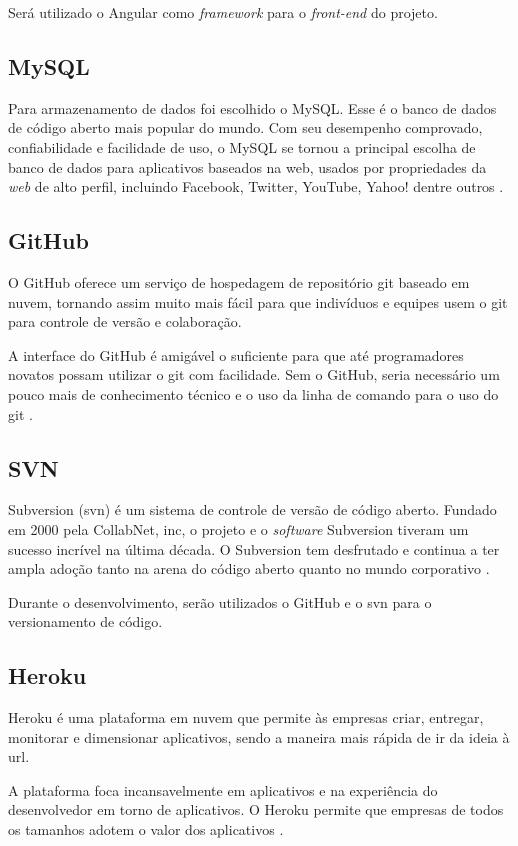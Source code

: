 \documentclass[
    12pt,               %
    openright,          %
    oneside,
    a4paper,            %
    paginasA3,  %
    english,            %
    brazil              %
    ]{ifsp-spo-inf-ctds} %
\begin{document}
Será utilizado o Angular como \textit{\gls{framework}} para o \textit{\gls{front-end}} do projeto.

\subsection{MySQL}
Para armazenamento de dados foi escolhido o MySQL. Esse é o banco de dados de código aberto mais popular do mundo. Com seu desempenho comprovado, confiabilidade e facilidade de uso, o MySQL se tornou a principal escolha de banco de dados para aplicativos baseados na web, usados por propriedades da \textit{\gls{web}} de alto perfil, incluindo Facebook, Twitter, YouTube, Yahoo! dentre outros \cite{mysql:2021}.

\subsection{GitHub}
O GitHub oferece um serviço de hospedagem de repositório \gls{git} baseado em nuvem, tornando assim muito mais fácil para que indivíduos e equipes usem o \gls{git} para controle de versão e colaboração.


A interface do GitHub é amigável o suficiente para que até programadores novatos possam utilizar o \gls{git} com facilidade. Sem o GitHub, seria necessário um pouco mais de conhecimento técnico e o uso da linha de comando para o uso do \gls{git} \cite{github:2021}.

\subsection{SVN}
Subversion (\ac{svn}) é um sistema de controle de versão de código aberto. Fundado em 2000 pela CollabNet, \ac{inc}, o projeto e o \textit{\gls{software}} Subversion tiveram um sucesso incrível na última década. O Subversion tem desfrutado e continua a ter ampla adoção tanto na arena do código aberto quanto no mundo corporativo \cite{svn:2021}.


Durante o desenvolvimento, serão utilizados o GitHub e o \ac{svn} para o versionamento de código.

\subsection{Heroku}
Heroku é uma plataforma em nuvem que permite às empresas criar, entregar, monitorar e dimensionar aplicativos, sendo a maneira mais rápida de ir da ideia à \ac{url}.


A plataforma foca incansavelmente em aplicativos e na experiência do desenvolvedor em torno de aplicativos. O Heroku permite que empresas de todos os tamanhos adotem o valor dos aplicativos \cite{heroku:2021}.
\end{document}
